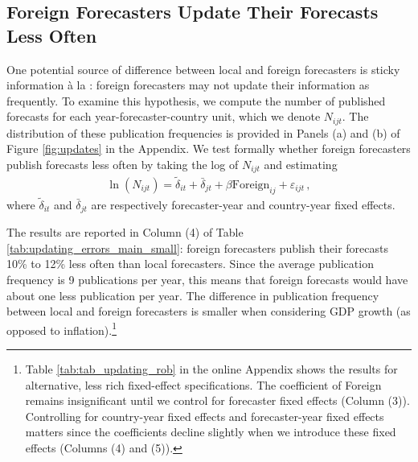 
\subsection{Foreign Forecasters Update Their Forecasts Less Often}

One potential source of difference between local and foreign forecasters is sticky information à la \citet{MankiwReis2002}: foreign forecasters may not update their information as frequently. To examine this hypothesis, we compute the number of published forecasts for each year-forecaster-country unit, which we denote $N_{ijt}$. The distribution of these publication frequencies is provided in Panels (a) and (b) of Figure \ref{fig:updates} in the Appendix.
We test formally whether foreign forecasters publish forecasts less often by taking the log of $N_{ijt}$ and estimating
\begin{align}
	\ln(N_{ijt}) = \tilde\delta_{it} + \bar{\delta}_{jt} +
\beta \text{Foreign}_{ij} + \varepsilon_{ijt}  \,, \label{eq:regN}
\end{align}
where  $\tilde\delta_{it} $ and $\bar{\delta}_{jt} $ are respectively forecaster-year and country-year fixed effects.%

The results are reported in Column (4) of Table \ref{tab:updating_errors_main_small}: foreign forecasters publish their forecasts 10\% to 12\% less often than local forecasters. Since the average publication frequency is 9 publications per year, this means that foreign forecasts would have about one less publication per year. The difference in publication frequency between local and foreign forecasters is smaller when considering GDP growth (as opposed to inflation).\footnote{Table \ref{tab:tab_updating_rob} in the online Appendix shows the results for alternative, less rich fixed-effect specifications. The coefficient of Foreign remains insignificant until we control for forecaster fixed effects (Column (3)). Controlling for country-year fixed effects and forecaster-year fixed effects matters since the coefficients decline slightly when we introduce these fixed effects (Columns (4) and (5)).}


